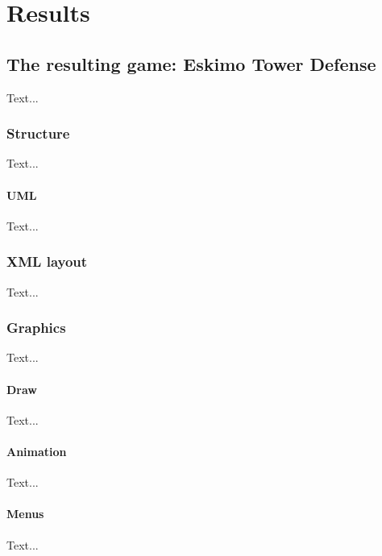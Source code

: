\chapter{Results}

\section{The resulting game: Eskimo Tower Defense}

Text...
\subsection{Structure}
Text...

\subsubsection{UML}

Text...
\subsection{XML layout}

Text...
\subsection{Graphics}

Text...

\subsubsection{Draw}

Text...

\subsubsection{Animation}

Text...

\subsubsection{Menus}
Text...

